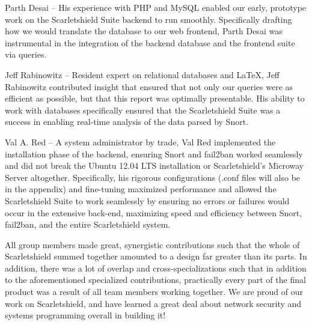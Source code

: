 \documentclass[12pt,letterpaper,titlepage]{report}
\begin{document}
{Parth Desai -- His experience with PHP and MySQL enabled our early, prototype
work on the Scarletshield Suite backend to run smoothly.  Specifically drafting
how we would translate the database to our web frontend, Parth Desai was
instrumental in the integration of the backend database and the frontend suite
via queries.

Jeff Rabinowitz -- Resident expert on relational databases and LaTeX, Jeff
Rabinowitz contributed insight that ensured that not only our queries were as
efficient as possible, but that this report was optimally presentable.  His
ability to work with databases specifically ensured that the Scarletshield Suite
was a success in enabling real-time analysis of the data parsed by Snort.

Val A. Red -- A system administrator by trade, Val Red implemented the
installation phase of the backend, ensuring Snort and fail2ban worked seamlessly
and did not break the Ubuntu 12.04 LTS installation or Scarletshield’s Microway
Server altogether.  Specifically, his rigorous configurations (.conf files will
also be in the appendix) and fine-tuning maximized performance and allowed the
Scarletshield Suite to work seamlessly by ensuring no errors or failures would
occur in the extensive back-end, maximizing speed and efficiency between Snort,
fail2ban, and the entire Scarletshield system.

All group members made great, synergistic contributions such that the whole of
Scarletshield summed together amounted to a design far greater than its parts.
In addition, there was a lot of overlap and cross-specializations such that in
addition to the aforementioned specialized contributions, practically every part
of the final product was a result of all team members working together. We are
proud of our work on Scarletshield, and have learned a great deal about network
security and systems programming overall in building it!



}
\printbibliography
\end{document}
